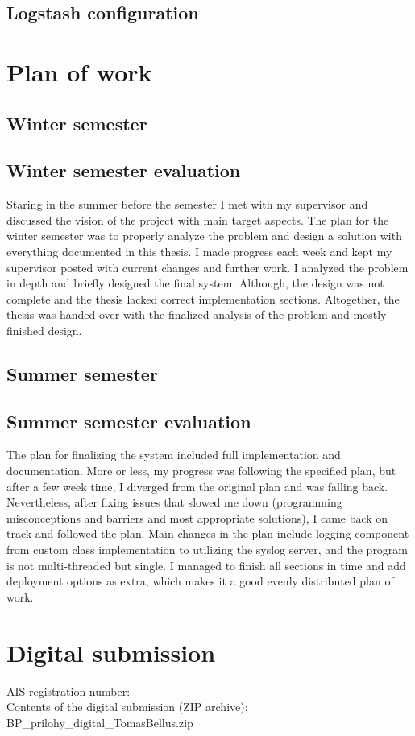 \documentclass[12pt,a4paper,twoside]{book}
\begin{document}
\begin{appendices}
    	\section{Logstash configuration} \label{lst:logstash:config}
        	
    \chapter{Plan of work}
        \section{Winter semester}
                
        \section{Winter semester evaluation}
            Staring in the summer before the semester I met with my supervisor and discussed the vision of the project with main target aspects. The plan for the winter semester was to properly analyze the problem and design a solution with everything documented in this thesis. I made progress each week and kept my supervisor posted with current changes and further work. I analyzed the problem in depth and briefly designed the final system. Although, the design was not complete and the thesis lacked correct implementation sections. Altogether, the thesis was handed over with the finalized analysis of the problem and mostly finished design.
        \section{Summer semester}
            
        \section{Summer semester evaluation}
            The plan for finalizing the system included full implementation and documentation. More or less, my progress was following the specified plan, but after a few week time, I diverged from the original plan and was falling back. Nevertheless, after fixing issues that slowed me down (programming misconceptions and barriers and most appropriate solutions), I came back on track and followed the plan. Main changes in the plan include logging component from custom class implementation to utilizing the syslog server, and the program is not multi-threaded but single. I managed to finish all sections in time and add deployment options as extra, which makes it a good evenly distributed plan of work.
        
    \chapter{Digital submission}
        \noindent AIS registration number: \myEvidenceNumber\\
        Contents of the digital submission (ZIP archive): BP\_prilohy\_digital\_TomasBellus.zip\\
        
\end{appendices}
\end{document}
